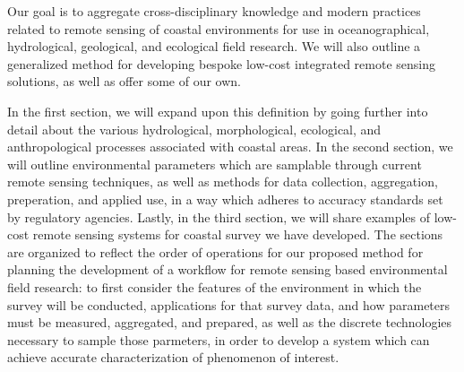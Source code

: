 \documentclass{article}
\begin{document}
\par{Our goal is to aggregate cross-disciplinary knowledge and modern practices related to remote sensing of coastal environments for use in oceanographical, hydrological, geological, and ecological field research. We will also outline a generalized method for developing bespoke low-cost integrated remote sensing solutions, as well as offer some of our own.} 

\par{In the first section, we will expand upon this definition by going further into detail about the various hydrological, morphological, ecological, and anthropological processes associated with coastal areas. In the second section, we will outline environmental parameters which are samplable through current remote sensing techniques, as well as methods for data collection, aggregation, preperation, and applied use, in a way which adheres to accuracy standards set by regulatory agencies. Lastly, in the third section, we will share examples of low-cost remote sensing systems for coastal survey we have developed. The sections are organized to reflect the order of operations for our proposed method for planning the development of a workflow for remote sensing based environmental field research: to first consider the features of the environment in which the survey will be conducted, applications for that survey data, and how parameters must be measured, aggregated, and prepared, as well as the discrete technologies necessary to sample those parmeters, in order to develop a system which can achieve accurate characterization of phenomenon of interest.}

\thispagestyle{fancy}
\end{document}
